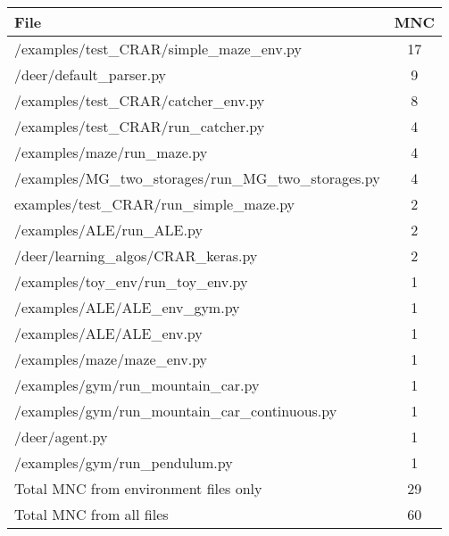\begin{tabular}{lc}
\toprule
\textbf{File} &
\textbf{\ac{MNC}} \\
\toprule 
/examples/test\_CRAR/simple\_maze\_env.py & 17 \\
/deer/default\_parser.py & 9 \\
/examples/test\_CRAR/catcher\_env.py & 8 \\
/examples/test\_CRAR/run\_catcher.py & 4 \\
/examples/maze/run\_maze.py & 4 \\
/examples/MG\_two\_storages/run\_MG\_two\_storages.py & 4 \\
examples/test\_CRAR/run\_simple\_maze.py & 2 \\
/examples/ALE/run\_ALE.py & 2 \\
/deer/learning\_algos/CRAR\_keras.py & 2 \\
/examples/toy\_env/run\_toy\_env.py & 1 \\
/examples/ALE/ALE\_env\_gym.py & 1 \\
/examples/ALE/ALE\_env.py & 1 \\
/examples/maze/maze\_env.py & 1 \\
/examples/gym/run\_mountain\_car.py & 1 \\
/examples/gym/run\_mountain\_car\_continuous.py & 1 \\
/deer/agent.py & 1 \\ 
/examples/gym/run\_pendulum.py & 1 \\
\midrule
Total MNC from environment files only & 29 \\
Total MNC from all files & 60 \\
\bottomrule
\end{tabular}%

